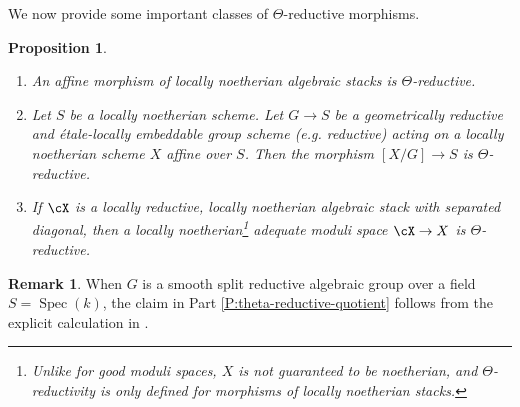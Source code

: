 \documentclass[a4paper]{amsart}
\numberwithin{equation}{section}
\theoremstyle{plain}
\newtheorem{prop}[thm]{Proposition}
\theoremstyle{definition}
\newtheorem{remark}[thm]{Remark}
\DeclareMathOperator{\Spec}{Spec}
\begin{document}
We now provide some important classes of $\Theta$-reductive morphisms.

\begin{prop} \label{P:theta-reductive}
 \qquad
\begin{enumerate}
	\item \label{P:theta-reductive-affine}
		An affine morphism of locally noetherian algebraic stacks is $\Theta$-reductive.
	\item \label{P:theta-reductive-quotient}
		Let $S$ be a locally noetherian scheme.  Let $G \to S$ be a geometrically reductive and \'etale-locally embeddable group scheme (e.g. reductive) acting on a locally noetherian scheme $X$ affine over $S$.  Then the morphism $[X/G] \to S$ is $\Theta$-reductive.
	\item \label{P:theta-reductive-ams} If $\cX$ is a locally reductive, locally noetherian algebraic stack with separated diagonal, then a locally noetherian\footnote{Unlike for good moduli spaces, $X$ is not guaranteed to be noetherian, and $\Theta$-reductivity is only defined for morphisms of locally noetherian stacks.} adequate moduli space $\cX \to X$ is $\Theta$-reductive.
\end{enumerate} 
\end{prop}


\begin{remark}
When $G$ is a smooth split reductive algebraic group over a field $S=\Spec(k)$, the claim in Part \eqref{P:theta-reductive-quotient} follows from the explicit calculation in .
\end{remark}
\end{document}
